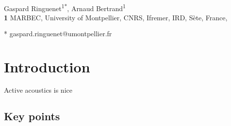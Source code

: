 \documentclass[
  10pt,
  letterpaper,
]{article}
\begin{document}
\vspace*{0.2in}

\begin{flushleft}
{\Large
\textbf{} %
}
\newline
\\
Gaspard Ringuenet\textsuperscript{1*}, Arnaud
Bertrand\textsuperscript{1}
\\
\bigskip
\textbf{1} MARBEC, University of Montpellier, CNRS, Ifremer, IRD, Sète,
France, 
\bigskip

% 
%





* gaspard.ringuenet@umontpellier.fr

\end{flushleft}



\linenumbers

\section{Introduction}\label{introduction}

Active acoustics is nice

\subsection{Key points}\label{key-points}
\end{document}
